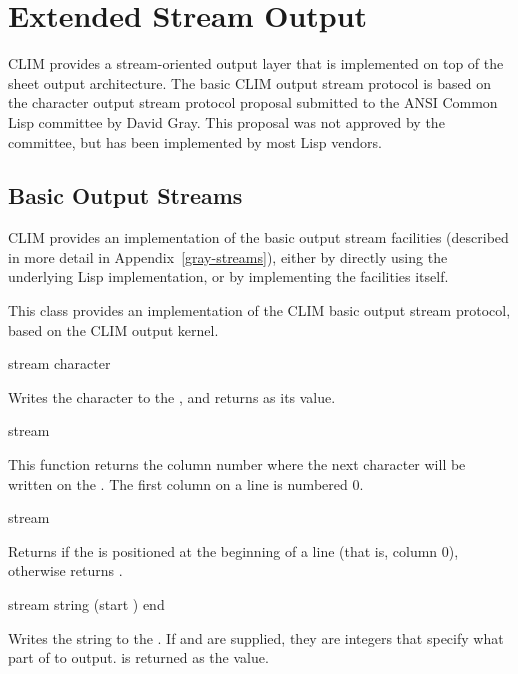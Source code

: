 
\chapter {Extended Stream Output}
\label {extended-output}

CLIM provides a stream-oriented output layer that is implemented on top of the
sheet output architecture.  The basic CLIM output stream protocol is based on
the character output stream protocol proposal submitted to the ANSI Common Lisp
committee by David Gray.  This proposal was not approved by the committee, but
has been implemented by most Lisp vendors.

\section {Basic Output Streams}

CLIM provides an implementation of the basic output stream facilities (described
in more detail in Appendix~\ref{gray-streams}), either by directly using the
underlying Lisp implementation, or by implementing the facilities itself.


This class provides an implementation of the CLIM basic output stream protocol,
based on the CLIM output kernel.
\Mutable

 {stream character}

Writes the character  to the  ,
and returns  as its value.

 {stream}

This function returns the column number where the next character will be written
on the  .  The first column on a line is
numbered 0.

 {stream}

Returns  if the   is positioned at
the beginning of a line (that is, column 0), otherwise returns .

 {stream string \optional (start ) end}

Writes the string  to the  .  If
 and  are supplied, they are integers that specify what part
of  to output.   is returned as the value.

